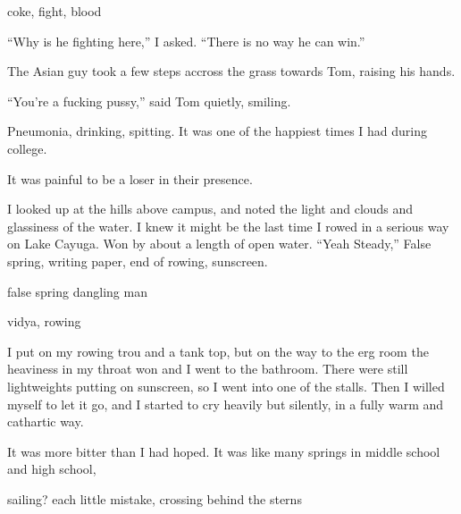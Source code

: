coke, fight, blood

``Why is he fighting here,'' I asked.  ``There is no way he can win.'' 

The Asian guy took a few steps accross the grass towards Tom, raising his hands.

``You're a fucking pussy,'' said Tom quietly, smiling. 

Pneumonia, drinking, spitting.  It was one of the happiest times I had during college.

It was painful to be a loser in their presence.  

I looked up at the hills above campus, and noted the light and clouds and
glassiness of the water.  I knew it might be the last time I rowed in a serious
way on Lake Cayuga.  Won by about a length of open water.  ``Yeah Steady,'' False
spring, writing paper, end of rowing, sunscreen.

false spring
dangling man




vidya, rowing

I put on my rowing trou and a tank top, but on the way to the erg room the
heaviness in my throat won and I went to the bathroom.  There were still
lightweights putting on sunscreen, so I went into one of the stalls.  Then I
willed myself to let it go, and I started to cry heavily but silently, in a
fully warm and cathartic way.  

It was more bitter than I had hoped.  It was like many springs in middle school
and high school, 

sailing?  each little mistake, crossing behind the sterns

